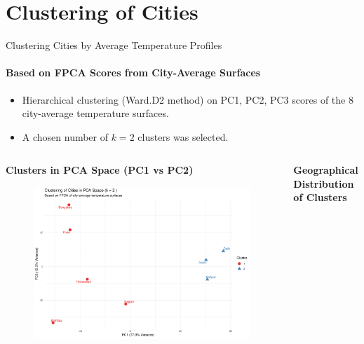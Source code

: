 \documentclass[svgnames, 12pt]{beamer}
\begin{document}
\section{Clustering of Cities}
\begin{frame}{Clustering Cities by Average Temperature Profiles}
  \framesubtitle{Based on FPCA Scores from City-Average Surfaces}
  \begin{itemize}
    \item Hierarchical clustering (Ward.D2 method) on PC1, PC2, PC3 scores of the 8 city-average temperature surfaces.
    \item A chosen number of $k=2$ clusters was selected.
  \end{itemize}
  \begin{columns}[T]
    \begin{column}{0.5\textwidth}
      \textbf{Clusters in PCA Space (PC1 vs PC2)}
      \begin{figure}
        \includegraphics[width=\linewidth]{../data/output/figures/pca_clusters_city_avg.png}
      \end{figure}
    \end{column}
    \begin{column}{0.5\textwidth}
      \textbf{Geographical Distribution of Clusters}
      \begin{figure}

\end{figure}
\end{column}
\end{columns}
\end{frame}
\end{document}
